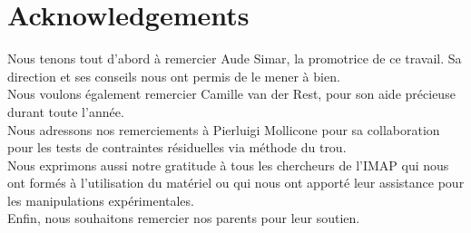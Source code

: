 \documentclass[
11pt, %
british, %
singlespacing, %
headsepline, %
]{MastersDoctoralThesis} %
\begin{document}


\chapter*{Acknowledgements}



Nous tenons tout d'abord à remercier Aude Simar, la promotrice de ce travail. Sa direction et ses conseils nous ont permis de le mener à bien.\\

Nous voulons également remercier Camille van der Rest, pour son aide précieuse durant toute l'année.\\

Nous adressons nos remerciements à Pierluigi Mollicone pour sa collaboration pour les tests de contraintes résiduelles via méthode du trou.\\

Nous exprimons aussi notre gratitude à tous les chercheurs de l'IMAP qui nous ont formés à l'utilisation du matériel ou qui nous ont apporté leur assistance pour les manipulations expérimentales.\\ %

Enfin, nous souhaitons remercier nos parents pour leur soutien.\\


\end{document}
